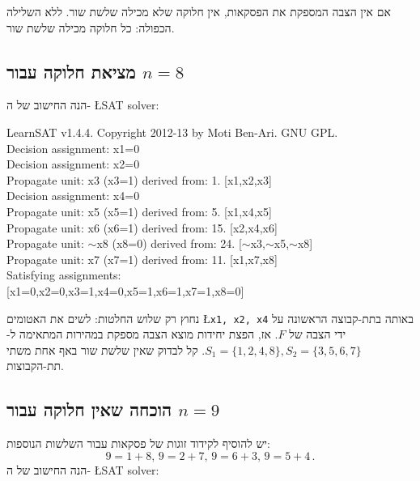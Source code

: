 \documentclass[12pt,a4paper]{article}
\begin{document}
אם אין הצבה המספקת את הפסקאות, אין חלוקה שלא מכילה שלשת שור. ללא השלילה הכפולה: כל חלוקה מכילה שלשת שור.

\subsection*{מציאת חלוקה עבור $n=8$}

הנה החישוב של ה-%
\L{SAT solver}:

\begin{ttfamily}
LearnSAT v1.4.4. Copyright 2012-13 by Moti Ben-Ari. GNU GPL.\\
Decision assignment: x1=0\\
Decision assignment: x2=0\\
Propagate unit:  x3 (x3=1) derived from: 1. [x1,x2,x3]\\
Decision assignment: x4=0\\
Propagate unit:  x5 (x5=1) derived from: 5. [x1,x4,x5]\\
Propagate unit:  x6 (x6=1) derived from: 15. [x2,x4,x6]\\
Propagate unit: $\sim$x8 (x8=0) derived from: 24. [$\sim$x3,$\sim$x5,$\sim$x8]\\
Propagate unit:  x7 (x7=1) derived from: 11. [x1,x7,x8]\\
Satisfying assignments:\\
{[}x1=0,x2=0,x3=1,x4=0,x5=1,x6=1,x7=1,x8=0]
\end{ttfamily}

נחוץ רק שלוש החלטות: לשים את האטומים 
\L{\texttt{x1, x2, x4}}
באותה בתת-קבוצה הראשונה על ידי הצבה של
$F$.
אז, הפצת יחידות מוצא הצבה מספקת במהירות המתאימה ל-%
$S_1=\{1,2,4,8\}, S_2=\{3,5,6,7\}$.
קל לבדוק שאין שלשת שור באף אחת משתי תת-הקבוצות.

\subsection*{הוכחה שאין חלוקה עבור $n=9$}

יש להוסיף לקידוד זוגות של פסקאות עבור השלשות הנוספות:
\[
9=1+8,\, 9=2+7,\, 9=6+3,\, 9=5+4\,.
\]
הנה החישוב של ה-%
\L{SAT solver}:
\end{document}

